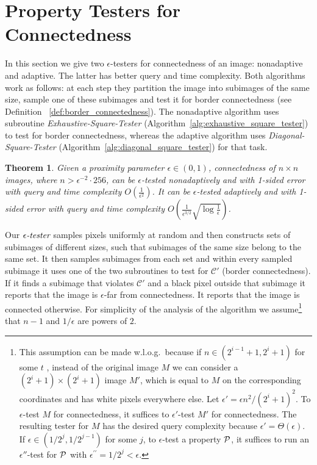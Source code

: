 \documentclass[11pt,english]{article}
\newtheorem{theorem}{Theorem}[section]
\numberwithin{figure}{section}
\newcommand{\C}{{\mathcal C}}
\newcommand{\eps}{{\epsilon}}
\newcommand{\ste}{{\epsilon\emph{-tester}}}
\newcommand{\lind}{t}
\begin{document}
\iffalse
\section{Property Testers for Connectedness}\label{tester_for_connectedness}
In this section we give two $\eps$-testers
for connectedness of an image: nonadaptive and adaptive. The latter has better
query and time complexity. Both algorithms work as follows: at each step they
partition the image into subimages of the same size, sample one of these
subimages and test it for  border connectedness (see Definition~
\ref{def:border_connectedness}). The nonadaptive algorithm uses subroutine \emph{Exhaustive-Square-Tester}
(Algorithm~\ref{alg:exhaustive_square_tester}) to test for border connectedness, whereas the adaptive algorithm uses \emph{Diagonal-Square-Tester} (Algorithm~\ref{alg:diagonal_square_tester}) for that task.

 \begin{theorem}\label{thm:connectedness_tester}
Given a proximity parameter $\eps\in(0,1)$, connectedness of $n\times n$ images, where  $n>\eps^{-2}\cdot 256$, can be $\eps$-tested nonadaptively and with 1-sided error with query and time complexity $O(\frac{1}{\eps^{2}})$.
It can be $\eps$-tested adaptively and with 1-sided error with query and time complexity $O(\frac{1}{\eps^{3/2}} \sqrt{\log\frac{1}{\eps}})$.
\end{theorem}

Our $\ste$ samples pixels uniformly at random and
then constructs sets of subimages of different sizes, such that subimages of the
same size belong to the same set.
It then samples subimages from each set and within every sampled subimage
it uses one of the two subroutines to test for $\C'$ (border
connectedness). If it finds a subimage that violates $\C'$ and a black
pixel outside that subimage it reports that the image is $\eps$-far from
connectedness. It reports that the image is connected otherwise. For simplicity
of the analysis of the algorithm we assume\footnote {This assumption can be made
w.l.o.g.\ because if $n\in(2^{i-1}+1,2^{i}+1)$ for some $\lind$ , instead of the original image $M$ we can consider a $(2^{i}+1)\times (2^{i}+1)$ image $M'$, which is equal to $M$ on the corresponding coordinates and has white pixels everywhere else. Let
$\eps'=\eps n^{2}/(2^{i}+1)^{2}$.
To $\eps$-test $M$ for connectedness, it suffices to $\eps'$-test $M'$ for connectedness.
The resulting tester for $M$ has the desired query complexity because $\eps'=\Theta(\eps)$. If $\eps\in(1/2^{j},1/2^{j-1})$ for
some $j$, to $\eps$-test a property ${\cal P}$, it suffices to run an $\eps''$-test for ${\cal P}$ with  $\eps^{\prime\prime}=1/2^{j}<\eps$.} that $n-1$ and $1/\eps$ are powers of
$2$.
\end{document}
